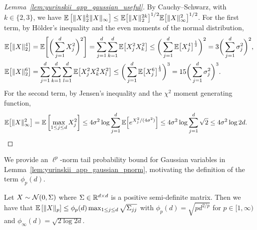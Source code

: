 \begin{proof}[Lemma~\ref{lem:yurinskii_app_gaussian_useful}]

  By Cauchy--Schwarz, with $k \in \{2,3\}$, we have
  $\mathbb{E}\left[\|X\|_2^{k} \|X\|_\infty \right]
  \leq \mathbb{E}\big[\|X\|_2^{2k} \big]^{1/2} \mathbb{E}\big[\|X\|_\infty^2 \big]^{1/2}$.
  For the first term, by H{\"o}lder's inequality and the even
  moments of the normal distribution,
  \begin{align*}
    \mathbb{E}\big[\|X\|_2^4 \big]
    &=
    \mathbb{E}\Bigg[
      \bigg(
        \sum_{j=1}^d X_j^2
      \bigg)^2
    \Bigg]
    =
    \sum_{j=1}^d \sum_{k=1}^d
    \mathbb{E}\big[
      X_j^2 X_k^2
    \big]
    \leq
    \bigg(
      \sum_{j=1}^d
      \mathbb{E}\big[X_j^4 \big]^{\frac{1}{2}}
    \bigg)^2
    =
    3 \bigg(
      \sum_{j=1}^d
      \sigma_j^2
    \bigg)^2, \\
    \mathbb{E}\big[\|X\|_2^6 \big]
    &=
    \sum_{j=1}^d \sum_{k=1}^d \sum_{l=1}^d
    \mathbb{E}\big[
      X_j^2 X_k^2 X_l^2
    \big]
    \leq
    \bigg(
      \sum_{j=1}^d
      \mathbb{E}\big[X_j^6 \big]^{\frac{1}{3}}
    \bigg)^3
    =
    15 \bigg(
      \sum_{j=1}^d
      \sigma_j^2
    \bigg)^3.
  \end{align*}
  For the second term, by Jensen's inequality and the $\chi^2$ moment
  generating function,
  \begin{align*}
    \mathbb{E}\big[\|X\|_\infty^2 \big]
    &=
    \mathbb{E}\left[
      \max_{1 \leq j \leq d}
      X_j^2
    \right]
    \leq
    4 \sigma^2
    \log
    \sum_{j=1}^d
    \mathbb{E}\Big[
      e^{X_j^2 / (4\sigma^2)}
    \Big]
    \leq
    4 \sigma^2
    \log
    \sum_{j=1}^d
    \sqrt{2}
    \leq
    4 \sigma^2
    \log 2 d.
  \end{align*}
\end{proof}

We provide an $\ell^p$-norm tail probability bound for Gaussian variables in
Lemma~\ref{lem:yurinskii_app_gaussian_pnorm}, motivating the definition of the
term
$\phi_p(d)$.

\begin{lemma}%
  \label{lem:yurinskii_app_gaussian_pnorm}
  Let $X \sim \mathcal{N}(0, \Sigma)$ where $\Sigma \in \mathbb{R}^{d \times d}$
  is a positive semi-definite matrix. Then we have that
  $\mathbb{E}\left[ \|X\|_p \right] \leq
  \phi_p(d) \max_{1 \leq j \leq d} \sqrt{\Sigma_{j j}}$
  with $\phi_p(d) = \sqrt{pd^{2/p} }$ for $p \in [1,\infty)$
  and $\phi_\infty(d) = \sqrt{2\log 2d}$.
\end{lemma}

